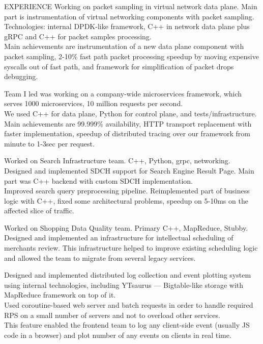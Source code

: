 \documentclass[12pt]{cutecv}
\begin{document}
\begin{paracol}{2}
\begin{leftcolumn}
\end{leftcolumn}

\begin{rightcolumn}
\begin{cvsection}{EXPERIENCE}
  {Working on packet sampling in virtual network data plane. Main part is instrumentation of virtual
  networking components with packet sampling. \\
  Technologies: internal DPDK-like framework, C++ in network data plane plus gRPC and C++ for packet samples processing. \\
  Main achievements are instrumentation of a new data plane component with packet sampling,
  2-10\% fast path packet processing speedup by moving expensive syscalls out of fast path, and framework for 
  simplification of packet drops debugging.}
  
  {Team I led was working on a company-wide microservices framework, which serves
  1000 microservices, 10 million requests per second.\\
  We used C++ for data plane, Python for control plane, and tests/infrastructure.\\
  Main achievements are 99.999\% availability, HTTP transport replacement
  with faster implementation, speedup of distributed tracing over our
  framework from minute to 1-3sec per request.}

  {Worked on Search Infrastructure team. C++, Python, grpc, networking.
  Designed and implemented SDCH support for Search Engine Result Page.
  Main part was C++ backend with custom SDCH implementation.\\
  Improved search query preprocessing pipeline. Reimplemented part of business logic with C++, 
  fixed some architectural problems, speedup on 5-10ms on the affected slice of traffic.}
  
  {Worked on Shopping Data Quality team. Primary C++, MapReduce, Stubby.
   Designed and implemented an infrastructure for intellectual scheduling of merchants review. This infrastructure helped to improve existing scheduling logic
   and allowed the team to migrate from several legacy services.}
  
  {Designed and implemented distributed log collection and event
   plotting system using internal technologies, including YTsaurus — Bigtable-like
   storage with MapReduce framework on top of it. \\
   Used coroutine-based web server and batch requests in order
   to handle required RPS on a small number of servers and not to overload
   other services. \\
   This feature enabled the frontend team to log any client-side
   event (usually JS code in a browser) and plot number of any events on
   clients in real time.}


\end{cvsection}
\end{rightcolumn}
\end{paracol}
\end{document}
